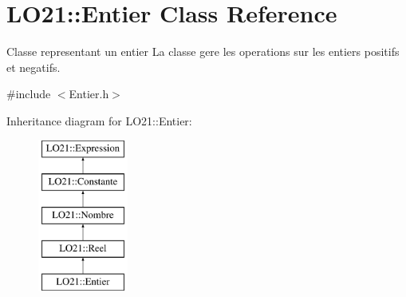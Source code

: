 \hypertarget{class_l_o21_1_1_entier}{\section{\-L\-O21\-:\-:\-Entier \-Class \-Reference}
\label{class_l_o21_1_1_entier}
}


\-Classe representant un entier \-La classe gere les operations sur les entiers positifs et negatifs.  




{\ttfamily \#include $<$\-Entier.\-h$>$}

\-Inheritance diagram for \-L\-O21\-:\-:\-Entier\-:\begin{figure}[H]
\begin{center}
\leavevmode
\includegraphics[height=5.000000cm]{class_l_o21_1_1_entier}
\end{center}
\end{figure}
